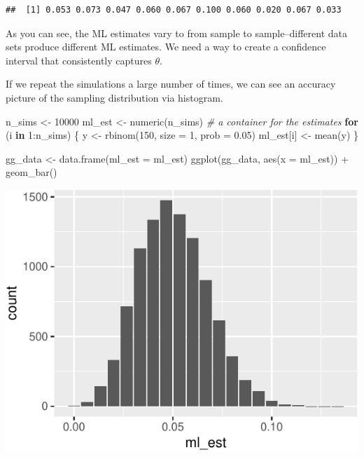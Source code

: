 \documentclass[
]{book}
\newenvironment{Shaded}{\begin{snugshade}}{\end{snugshade}}
\newcommand{\AttributeTok}[1]{\textcolor[rgb]{0.77,0.63,0.00}{#1}}
\newcommand{\CommentTok}[1]{\textcolor[rgb]{0.56,0.35,0.01}{\textit{#1}}}
\newcommand{\ControlFlowTok}[1]{\textcolor[rgb]{0.13,0.29,0.53}{\textbf{#1}}}
\newcommand{\DecValTok}[1]{\textcolor[rgb]{0.00,0.00,0.81}{#1}}
\newcommand{\FloatTok}[1]{\textcolor[rgb]{0.00,0.00,0.81}{#1}}
\newcommand{\FunctionTok}[1]{\textcolor[rgb]{0.00,0.00,0.00}{#1}}
\newcommand{\NormalTok}[1]{#1}
\newcommand{\OtherTok}[1]{\textcolor[rgb]{0.56,0.35,0.01}{#1}}
\newcommand{\SpecialCharTok}[1]{\textcolor[rgb]{0.00,0.00,0.00}{#1}}
\begin{document}
\begin{verbatim}
##  [1] 0.053 0.073 0.047 0.060 0.067 0.100 0.060 0.020 0.067 0.033
\end{verbatim}

As you can see, the ML estimates vary to from sample to
sample--different data sets produce different ML estimates. We need a
way to create a confidence interval that consistently captures
\(\theta\).

If we repeat the simulations a large number of times, we can see an
accuracy picture of the sampling distribution via histogram.

\begin{Shaded}
\begin{Highlighting}[]
\NormalTok{n\_sims }\OtherTok{\textless{}{-}} \DecValTok{10000}
\NormalTok{ml\_est }\OtherTok{\textless{}{-}} \FunctionTok{numeric}\NormalTok{(n\_sims)  }\CommentTok{\# a container for the estimates}
\ControlFlowTok{for}\NormalTok{ (i }\ControlFlowTok{in} \DecValTok{1}\SpecialCharTok{:}\NormalTok{n\_sims) \{}
\NormalTok{  y }\OtherTok{\textless{}{-}} \FunctionTok{rbinom}\NormalTok{(}\DecValTok{150}\NormalTok{, }\AttributeTok{size =} \DecValTok{1}\NormalTok{, }\AttributeTok{prob =} \FloatTok{0.05}\NormalTok{)}
\NormalTok{  ml\_est[i] }\OtherTok{\textless{}{-}} \FunctionTok{mean}\NormalTok{(y)}
\NormalTok{\}}

\NormalTok{gg\_data }\OtherTok{\textless{}{-}} \FunctionTok{data.frame}\NormalTok{(}\AttributeTok{ml\_est =}\NormalTok{ ml\_est)}
\FunctionTok{ggplot}\NormalTok{(gg\_data, }\FunctionTok{aes}\NormalTok{(}\AttributeTok{x =}\NormalTok{ ml\_est)) }\SpecialCharTok{+} 
  \FunctionTok{geom\_bar}\NormalTok{()}
\end{Highlighting}
\end{Shaded}

\includegraphics{01-04-bias-and-consistency_files/figure-latex/unnamed-chunk-3-1.pdf}
\end{document}
